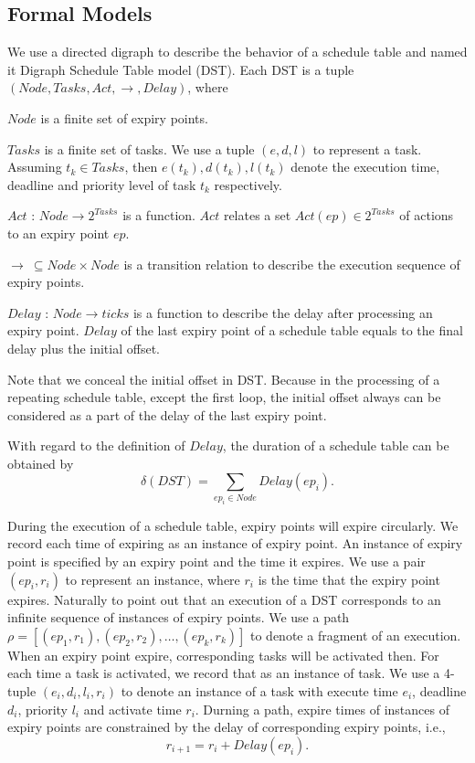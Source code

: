 \documentclass[sigconf]{acmart}
\begin{document}
\subsection{Formal Models}
We use a directed digraph to describe the behavior of a schedule table and named it Digraph Schedule Table model (DST). Each DST is a tuple $(Node,Tasks,Act,\rightarrow,Delay)$, where
\begin{compactitem}
  \item $Node$ is a finite set of expiry points.
  \item $Tasks$ is a finite set of tasks. We use a tuple $(e,d,l)$ to represent a task. Assuming $t_k\in Tasks$, then $e(t_k),d(t_k),l(t_k)$ denote the execution time, deadline and priority level of task $t_k$ respectively.%
  \item $Act$ : $Node \rightarrow 2^{Tasks}$ is a function. $Act$ relates a set $Act(ep)\in 2^{Tasks}$ of actions to an expiry point $ep$.
  \item $\rightarrow\ \subseteq Node\times Node$ is a transition relation to describe the execution sequence of expiry points. 
  \item $Delay$ : $Node \rightarrow ticks$ is a function to describe the delay after processing an expiry point. $Delay$ of the last expiry point of a schedule table equals to the final delay plus the initial offset.
\end{compactitem}

Note that we conceal the initial offset in DST. Because in the processing of a repeating schedule table, except the first loop, the initial offset always can be considered as a part of the delay of the last expiry point.

With regard to the definition of $Delay$, the duration of a schedule table can be obtained by 
\[\delta(DST)=\sum\limits_{ep_i\in Node}Delay(ep_i).\]

During the execution of a schedule table, expiry points will expire circularly. We record each time of expiring as an instance of expiry point. An instance of expiry point is specified by an expiry point and the time it expires. We use a pair $(ep_i,r_i)$ to represent an instance, where $r_i$ is the time that the expiry point expires. 
Naturally to point out that an execution of a DST corresponds to an infinite sequence of instances of expiry points. 
We use a path $\rho=[(ep_1,r_1),(ep_2,r_2),\dots,(ep_k,r_k)]$ to denote a fragment of an execution. When an expiry point expire, corresponding tasks will be activated then. For each time a task is activated, we record that as an instance of task. We use a 4-tuple $(e_i,d_i,l_i,r_i)$ to denote an instance of a task with execute time $e_i$, deadline $d_i$, priority $l_i$ and activate time $r_i$. Durning a path, expire times of instances of expiry points are constrained by the delay of corresponding expiry points, i.e., 
\[r_{i+1}=r_i+Delay(ep_i).\]
\end{document}
